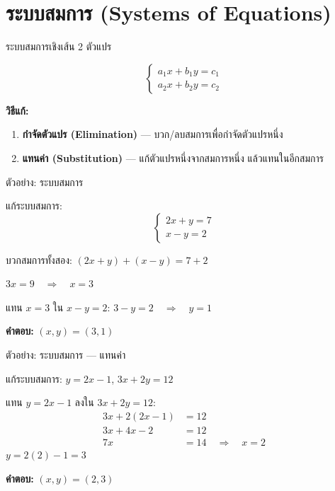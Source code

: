 \documentclass[11pt, aspectratio=169]{beamer}
\begin{document}
\section{ระบบสมการ (Systems of Equations)}

\begin{frame}{ระบบสมการเชิงเส้น 2 ตัวแปร}
  \begin{explanation}[รูปแบบ]
    \[
      \begin{cases}
        a_1x + b_1y = c_1 \\
        a_2x + b_2y = c_2
      \end{cases}
    \]

    \textbf{วิธีแก้:}
    \begin{enumerate}
      \item \textbf{กำจัดตัวแปร (Elimination)} — บวก/ลบสมการเพื่อกำจัดตัวแปรหนึ่ง
      \item \textbf{แทนค่า (Substitution)} — แก้ตัวแปรหนึ่งจากสมการหนึ่ง แล้วแทนในอีกสมการ
    \end{enumerate}
  \end{explanation}
\end{frame}

\begin{frame}{ตัวอย่าง: ระบบสมการ}
  \begin{exambox}[โจทย์]
    แก้ระบบสมการ:
    \[
      \begin{cases}
        2x + y = 7 \\
        x - y = 2
      \end{cases}
    \]
  \end{exambox}

  \begin{solbox}
    บวกสมการทั้งสอง: $(2x + y) + (x - y) = 7 + 2$

    $3x = 9 \quad \Rightarrow \quad x = 3$

    แทน $x = 3$ ใน $x - y = 2$: \; $3 - y = 2 \quad \Rightarrow \quad y = 1$

    \textbf{คำตอบ:} $(x, y) = (3, 1)$
  \end{solbox}
\end{frame}

\begin{frame}{ตัวอย่าง: ระบบสมการ — แทนค่า}
  \begin{exambox}[โจทย์]
    แก้ระบบสมการ: \quad $y = 2x - 1$, \;\; $3x + 2y = 12$
  \end{exambox}

  \begin{solbox}[วิธีทำ]
    แทน $y = 2x - 1$ ลงใน $3x + 2y = 12$:
    \begin{align*}
      3x + 2(2x - 1) &= 12 \\
      3x + 4x - 2 &= 12 \\
      7x &= 14 \quad \Rightarrow \quad x = 2
    \end{align*}
    $y = 2(2) - 1 = 3$

    \textbf{คำตอบ:} $(x, y) = (2, 3)$
  \end{solbox}
\end{frame}
\end{document}

